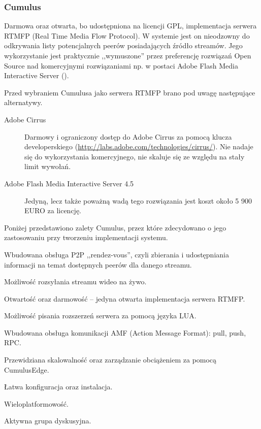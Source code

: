 \newpage
\subsubsection{Cumulus}
Darmowa oraz otwarta, bo udostępniona na licencji GPL, implementacja serwera RTMFP (Real Time Media Flow Protocol). W systemie jest on nieodzowny do odkrywania listy potencjalnych peerów posiadających źródło streamów. Jego wykorzystanie jest praktycznie ,,wymuszone'' przez preferencję rozwiązań Open Source nad komercyjnymi rozwiązaniami np. w postaci Adobe Flash Media Interactive Server (\cite{Cumulus}).

Przed wybraniem Cumulusa jako serwera RTMFP brano pod uwagę następujące alternatywy.
\begin{description}
    \item[Adobe Cirrus] Darmowy i ograniczony dostęp do Adobe Cirrus za pomocą klucza developerskiego (\url{http://labs.adobe.com/technologies/cirrus/}). Nie nadaje się do wykorzystania komercyjnego, nie skaluje się ze względu na stały limit wywołań.
    \item[Adobe Flash Media Interactive Server 4.5] Jedyną, lecz także poważną wadą tego rozwiązania jest koszt około 5 900 EURO za licencję.
\end{description}

Poniżej przedstawiono zalety Cumulus, przez które zdecydowano o jego zastosowaniu przy tworzeniu implementacji systemu.
\begin{packed_item}
    \item{Wbudowana obsługa P2P ,,rendez-vous'', czyli zbierania i udostępniania informacji na temat dostępnych peerów dla danego streamu.}
    \item{Możliwość rozsyłania streamu wideo na żywo.}
    \item{Otwartość oraz darmowość -- jedyna otwarta implementacja serwera RTMFP.}
    \item{Możliwość pisania rozszerzeń serwera za pomocą języka LUA.}
    \item{Wbudowana obsługa komunikacji AMF (Action Message Format): pull, push, RPC.}
    \item{Przewidziana skalowalność oraz zarządzanie obciążeniem za pomocą CumulusEdge.}
    \item{Łatwa konfiguracja oraz instalacja.}
    \item{Wieloplatformowość.}
    \item{Aktywna grupa dyskusyjna.}
\end{packed_item}

